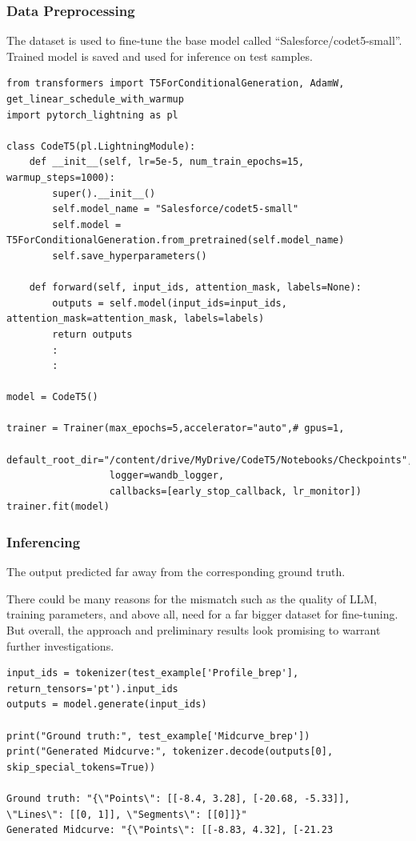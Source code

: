 \begin{frame}[fragile]\frametitle{Data Preprocessing}

The dataset is used to fine-tune the base model called ``Salesforce/codet5-small''. Trained model is saved and used for inference on test samples.

\begin{lstlisting}[basicstyle=\tiny, breaklines=true, breakatwhitespace=true,label=lst:python]
from transformers import T5ForConditionalGeneration, AdamW, get_linear_schedule_with_warmup
import pytorch_lightning as pl

class CodeT5(pl.LightningModule):
    def __init__(self, lr=5e-5, num_train_epochs=15, warmup_steps=1000):
        super().__init__()
        self.model_name = "Salesforce/codet5-small"
        self.model = T5ForConditionalGeneration.from_pretrained(self.model_name)
        self.save_hyperparameters()
        
    def forward(self, input_ids, attention_mask, labels=None):
        outputs = self.model(input_ids=input_ids, attention_mask=attention_mask, labels=labels)
        return outputs        
        :
        :

model = CodeT5()

trainer = Trainer(max_epochs=5,accelerator="auto",# gpus=1,
                  default_root_dir="/content/drive/MyDrive/CodeT5/Notebooks/Checkpoints",
                  logger=wandb_logger,
                  callbacks=[early_stop_callback, lr_monitor])
trainer.fit(model)
\end{lstlisting}

\end{frame}

\begin{frame}[fragile]\frametitle{Inferencing}

The output predicted far away from the corresponding ground truth. 

There could be many reasons for the mismatch such as the quality of LLM, training parameters, and above all, need for a far bigger dataset for fine-tuning. But overall, the approach and preliminary results look promising to warrant further investigations.

\begin{lstlisting}[basicstyle=\tiny, breaklines=true, breakatwhitespace=true,label=lst:python]
input_ids = tokenizer(test_example['Profile_brep'], return_tensors='pt').input_ids
outputs = model.generate(input_ids)

print("Ground truth:", test_example['Midcurve_brep'])
print("Generated Midcurve:", tokenizer.decode(outputs[0], skip_special_tokens=True))

Ground truth: "{\"Points\": [[-8.4, 3.28], [-20.68, -5.33]], \"Lines\": [[0, 1]], \"Segments\": [[0]]}"
Generated Midcurve: "{\"Points\": [[-8.83, 4.32], [-21.23
\end{lstlisting}

\end{frame}